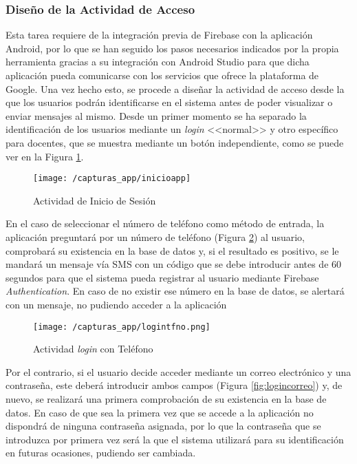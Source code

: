 \subsubsection{Diseño de la Actividad de Acceso}
Esta tarea requiere de la integración previa de Firebase con la aplicación Android, por lo que se han seguido los pasos necesarios indicados por la propia herramienta gracias a su integración con Android Studio para que dicha aplicación pueda comunicarse con los servicios que ofrece la plataforma de Google. Una vez hecho esto, se procede a diseñar la actividad de acceso desde la que los usuarios podrán identificarse en el sistema antes de poder visualizar o enviar mensajes al mismo. Desde un primer momento se ha separado la identificación de los usuarios mediante un \textit{login} <<normal>> y otro específico para docentes, que se muestra mediante un botón independiente, como se puede ver en la Figura \ref{fig:login1}.

\begin{figure}[!h]
	\begin{center}
		\texttt{[image: /capturas\_app/inicioapp]}
		\caption{Actividad de Inicio de Sesión}
		\label{fig:login1}
	\end{center}
\end{figure}

\newpage

En el caso de seleccionar el número de teléfono como método de entrada, la aplicación preguntará por un número de teléfono (Figura \ref{fig:logintfno}) al usuario, comprobará su existencia en la base de datos y, si el resultado es positivo, se le mandará un mensaje vía \acs{SMS} con un código que se debe introducir antes de 60 segundos para que el sistema pueda registrar al usuario mediante Firebase \textit{Authentication}. En caso de no existir ese número en la base de datos, se alertará con un mensaje, no pudiendo acceder a la aplicación

\begin{figure}[!h]
	\begin{center}
		\texttt{[image: /capturas\_app/logintfno.png]}
		\caption{Actividad \textit{login} con Teléfono}
		\label{fig:logintfno}
	\end{center}
\end{figure}

Por el contrario, si el usuario decide acceder mediante un correo electrónico y una contraseña, este deberá introducir ambos campos (Figura \ref{fig:logincorreo}) y, de nuevo, se realizará una primera comprobación de su existencia en la base de datos. En caso de que sea la primera vez que se accede a la aplicación no dispondrá de ninguna contraseña asignada, por lo que la contraseña que se introduzca por primera vez será la que el sistema utilizará para su identificación en futuras ocasiones, pudiendo ser cambiada.

